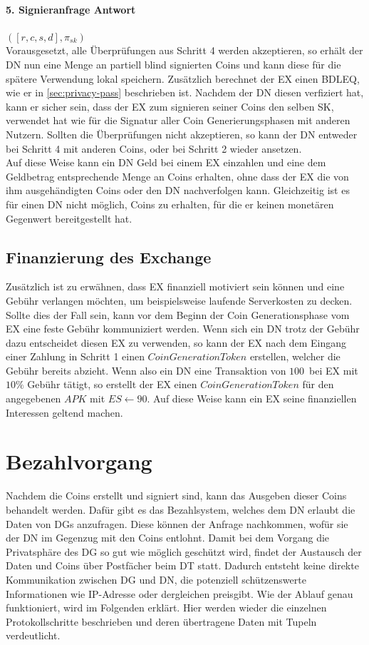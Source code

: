 \documentclass[
	fontsize=11pt,
	headings=small,
	parskip=half,           %
	bibliography=totoc,
	numbers=noenddot,       %
	open=any,               %
]{scrreprt}
\begin{document}
\paragraph{5. Signieranfrage Antwort} $([r,c,s,d], \pi_{sk})$ \\
Vorausgesetzt, alle Überprüfungen aus Schritt 4 werden akzeptieren, so erhält der DN nun eine Menge an partiell blind signierten Coins und kann diese für die spätere Verwendung lokal speichern. Zusätzlich berechnet der EX einen BDLEQ, wie er in \ref{sec:privacy-pass} beschrieben ist. Nachdem der DN diesen verfiziert hat, kann er sicher sein, dass der EX zum signieren seiner Coins den selben SK, verwendet hat wie für die Signatur aller Coin Generierungsphasen mit anderen Nutzern. Sollten die Überprüfungen nicht akzeptieren, so kann der DN entweder bei Schritt 4 mit anderen Coins, oder bei Schritt 2 wieder ansetzen.\\

Auf diese Weise kann ein DN Geld bei einem EX einzahlen und eine dem Geldbetrag entsprechende Menge an Coins erhalten, ohne dass der EX die von ihm ausgehändigten Coins oder den DN nachverfolgen kann. Gleichzeitig ist es für einen DN nicht möglich, Coins zu erhalten, für die er keinen monetären Gegenwert bereitgestellt hat.

\subsection{Finanzierung des Exchange}
Zusätzlich ist zu erwähnen, dass EX finanziell motiviert sein können und eine Gebühr verlangen möchten, um beispielsweise laufende Serverkosten zu decken. Sollte dies der Fall sein, kann vor dem Beginn der Coin Generationsphase vom EX eine feste Gebühr kommuniziert werden. Wenn sich ein DN trotz der Gebühr dazu entscheidet diesen EX zu verwenden, so kann der EX nach dem Eingang einer Zahlung in Schritt 1 einen $CoinGenerationToken$ erstellen, welcher die Gebühr bereits abzieht. Wenn also ein DN eine Transaktion von $100$\texteuro\ bei EX mit $10\%$ Gebühr tätigt, so erstellt der EX einen $CoinGenerationToken$ für den angegebenen $APK$ mit $ES \leftarrow 90$\texteuro. Auf diese Weise kann ein EX seine finanziellen Interessen geltend machen. 

\section{Bezahlvorgang}
\label{system:payment}
Nachdem die Coins erstellt und signiert sind, kann das Ausgeben dieser Coins behandelt werden. Dafür gibt es das Bezahlsystem, welches dem DN erlaubt die Daten von DGs anzufragen. Diese können der Anfrage nachkommen, wofür sie der DN im Gegenzug mit den Coins entlohnt. Damit bei dem Vorgang die Privatsphäre des DG so gut wie möglich geschützt wird, findet der Austausch der Daten und Coins über Postfächer beim DT statt. Dadurch entsteht keine direkte Kommunikation zwischen DG und DN, die potenziell schützenswerte Informationen wie IP-Adresse oder dergleichen preisgibt. Wie der Ablauf genau funktioniert, wird im Folgenden erklärt. Hier werden wieder die einzelnen Protokollschritte beschrieben und deren übertragene Daten mit Tupeln verdeutlicht.
\end{document}
